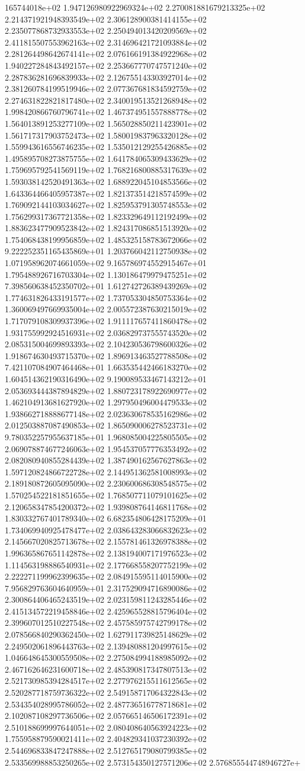 165744018e+02	1.947126980922969324e+02	2.270081881679213325e+02	2.214371921948393549e+02	2.306128900381414155e+02	2.235077868732933553e+02	2.250494013420209569e+02	2.411815507553962163e+02	2.314696421721093884e+02	2.281264498642674141e+02	2.076166191384922968e+02	1.940227284843492157e+02	2.253667770747571240e+02	2.287836281696839933e+02	2.126755143303927014e+02	2.381260784199519946e+02	2.077367681834592759e+02	2.274631822821817480e+02	2.340019513521268948e+02	1.998420866760796741e+02	1.467374951557888778e+02	1.564013891253277109e+02	1.565028850211423901e+02	1.561717317903752473e+02	1.580019837963320128e+02	1.559943616556746235e+02	1.535012129255426885e+02	1.495895708273875755e+02	1.641784065309433629e+02	1.759695792541569119e+02	1.768216800885317639e+02	1.593038142520491363e+02	1.688922045104853566e+02	1.643364466405957387e+02	1.821373514218574599e+02	1.769092144103034627e+02	1.825953791305748553e+02	1.756299317367721358e+02	1.823329649112192499e+02	1.883623477909523842e+02	1.824317086851513920e+02	1.754068438199956859e+02	1.485325158783672066e+02	9.222252351165435869e+01	1.203766042112750938e+02	1.071958962074661059e+02	9.165786974552915467e+01	1.795488926716703304e+02	1.130186479979475251e+02	7.398560638452350702e+01	1.612742726389439269e+02	1.774631826433191577e+02	1.737053304850753364e+02	1.360069497669935004e+02	2.005572387630215019e+02	1.717079108309937396e+02	1.911117657411860478e+02	1.931755992924516931e+02	2.036829737555743520e+02	2.085315004699893393e+02	2.104230536798600326e+02	1.918674630493715370e+02	1.896913463527788508e+02	7.421107084907464468e+01	1.663535442466183270e+02	1.604514362190316490e+02	9.190089533467143212e+01	2.053693444387894829e+02	1.880723178922690977e+02	1.462104913681627920e+02	1.297950496004479533e+02	1.938662718888677148e+02	2.023630678535162986e+02	2.012503887087490853e+02	1.865090006278523731e+02	9.780352257955637185e+01	1.968085004225805505e+02	2.069078874677246063e+02	1.954537057776353492e+02	2.082080940855284439e+02	1.387490162567627863e+02	1.597120824866722728e+02	2.144951362581008993e+02	2.189180872605095090e+02	2.230600686308548575e+02	1.570254522181851655e+02	1.768507711079101625e+02	2.120658347854200372e+02	1.939808764146811768e+02	1.830332767401789340e+02	6.682354806428175209e+01	1.734069940925478477e+02	2.038643283066832623e+02	2.145667020825713678e+02	2.155781461326978388e+02	1.996365867651142878e+02	2.138194007171976523e+02	1.114563198886540931e+02	2.177668558207752199e+02	2.222271199962399635e+02	2.084915595114015900e+02	7.956829763604640959e+01	2.317529094716890086e+02	2.300864406465243519e+02	2.023159811243285446e+02	2.415134572219458846e+02	2.425965528815796404e+02	2.399607012510227548e+02	2.457585975742799178e+02	2.078566840290362450e+02	1.627911739825148629e+02	2.249502061896443763e+02	2.139480881204997615e+02	1.046648645300559508e+02	2.275084994188985092e+02	2.467162646231600718e+02	2.485390817347807513e+02	2.521730985394284517e+02	2.277976215511612565e+02	2.520287718759736322e+02	2.549158717064322843e+02	2.534354028995786052e+02	2.487736516778718681e+02	2.102087108297736506e+02	2.057665146506172391e+02	2.510188699997644051e+02	2.080408640563924223e+02	1.755958879590021411e+02	2.404829341037230392e+02	2.544696833847247888e+02	2.512765179080799385e+02	2.533569988853250265e+02	2.573154350127571206e+02	2.576855544748946727e+